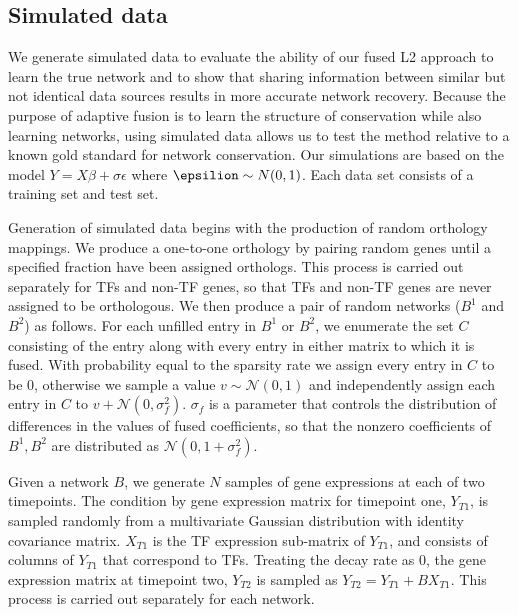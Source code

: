 \documentclass[11pt]{article}
\begin{document}


\subsection{Simulated data}
We generate simulated data to evaluate the ability of our fused L2 approach to learn the true network and to show that sharing information between similar but not identical data sources results in more accurate network recovery. Because the purpose of adaptive fusion is to learn the structure of conservation while also learning networks, using simulated data allows us to test the method relative to a known gold standard for network conservation. 
Our simulations are based on the model $Y=X\beta+\sigma \epsilon$ where $\epsilion \sim N(0,1)$. Each data set consists of a training set and test set. 

Generation of simulated data begins with the production of random orthology mappings. We produce a one-to-one orthology by pairing random genes until a specified fraction have been assigned orthologs. This process is carried out separately for TFs and non-TF genes, so that TFs and non-TF genes are never assigned to be orthologous. We then produce a pair of random networks ($B^1$ and $B^2$) as follows. For each unfilled entry in $B^1$ or $B^2$, we enumerate the set $C$ consisting of the entry along with every entry in either matrix to which it is fused. With probability equal to the sparsity rate we assign every entry in $C$ to be 0, otherwise we sample a value $v \sim \mathcal{N}(0,1)$ and independently assign each entry in $C$ to $v + \mathcal{N}(0, \sigma_f^2)$. $\sigma_f$ is a parameter that controls the distribution of differences in the values of fused coefficients, so that the nonzero coefficients of $B^1, B^2$ are distributed as $\mathcal{N}(0, 1 + \sigma_f^2)$.

Given a network $B$, we generate $N$ samples of gene expressions at each of two timepoints. The condition by gene expression matrix for timepoint one, $Y_{T1}$, is sampled randomly from a multivariate Gaussian distribution with identity covariance matrix. $X_{T1}$ is the TF expression sub-matrix of $Y_{T1}$, and consists of columns of $Y_{T1}$ that correspond to TFs. Treating the decay rate as 0, the gene expression matrix at timepoint two, $Y_{T2}$ is sampled as $Y_{T2} = Y_{T1} + BX_{T1}$. This process is carried out separately for each network. 
\end{document}
